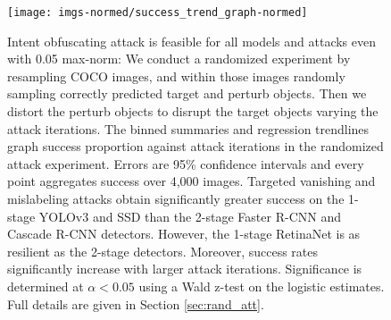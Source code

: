 \begin{figure}[tb]

{\centering \texttt{[image: imgs-normed/success\_trend\_graph-normed]} 

}

\caption{Intent obfuscating attack is feasible for all models and attacks even with 0.05 max-norm:  We conduct a randomized experiment by resampling COCO images, and within those images randomly sampling correctly predicted target and perturb objects. Then we distort the perturb objects to disrupt the target objects varying the attack iterations. The binned summaries and regression trendlines graph success proportion against attack iterations in the randomized attack experiment. Errors are 95\% confidence intervals and every point aggregates success over 4,000 images. Targeted vanishing and mislabeling attacks obtain significantly greater success on the 1-stage YOLOv3 and SSD than the 2-stage Faster R-CNN and Cascade R-CNN detectors. However, the 1-stage RetinaNet is as resilient as the 2-stage detectors. Moreover, success rates significantly increase with larger attack iterations. Significance is determined at $\alpha < 0.05$ using a Wald z-test on the logistic estimates. Full details are given in Section \ref{sec:rand_att}.}\label{fig:success_trend_graph_normed}
\end{figure}


